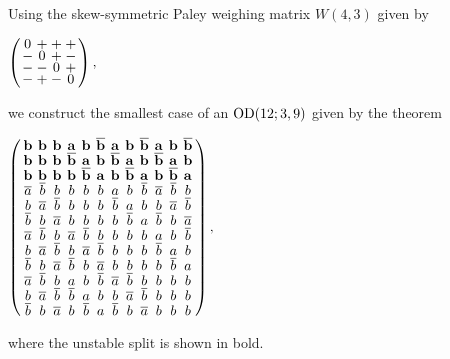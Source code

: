 \documentclass[../../../main]{subfiles}
\begin{document}
\begin{ex}
 Using the skew-symmetric Paley weighing matrix $W(4,3)$
 given by 
 \begin{defenum}
  \item $
  \arraycolsep=1.25pt\def\arraystretch{0.625}
  \left(\begin{array}{cccc}
  0&+&+&+\\
  -&0&+&-\\
  -&-&0&+\\
  -&+&-&0
  \end{array}\right),
  $
 \end{defenum}
 we construct the smallest case of an $\text{OD}(12; 3, 9)$ given by the theorem
 \begin{defenum}[resume]
  \item $
  \arraycolsep=2.0pt\def\arraystretch{0.5}
  \left(
    \begin{array}{cccccccccccc}
      \mathbf{b}&\mathbf{b}&\mathbf{b}&\mathbf{a}&\mathbf{b}&\mathbf{\bar b}&\mathbf{a}&\mathbf{b}&\mathbf{\bar b}&\mathbf{a}&\mathbf{b}&\mathbf{\bar b}\\
      \mathbf{b}&\mathbf{b}&\mathbf{b}&\mathbf{\bar b}&\mathbf{a}&\mathbf{b}&\mathbf{\bar b}&\mathbf{a}&\mathbf{b}&\mathbf{\bar b}&\mathbf{a}&\mathbf{b}\\
      \mathbf{b}&\mathbf{b}&\mathbf{b}&\mathbf{b}&\mathbf{\bar b}&\mathbf{a}&\mathbf{b}&\mathbf{\bar b}&\mathbf{a}&\mathbf{b}&\mathbf{\bar b}&\mathbf{a}\\
      \bar a&\bar b&b&b&b&b&a&b&\bar b&\bar a&\bar b&b\\
      b&\bar a&\bar b&b&b&b&\bar b&a&b&b&\bar a&\bar b\\
      \bar b&b&\bar a&b&b&b&b&\bar b&a&\bar b&b&\bar a\\
      \bar a&\bar b&b&\bar a&\bar b&b&b&b&b&a&b&\bar b\\
      b&\bar a&\bar b&b&\bar a&\bar b&b&b&b&\bar b&a&b\\
      \bar b&b&\bar a&\bar b&b&\bar a&b&b&b&b&\bar b&a\\
      \bar a&\bar b&b&a&b&\bar b&\bar a&\bar b&b&b&b&b\\
      b&\bar a&\bar b&\bar b&a&b&b&\bar a&\bar b&b&b&b\\
      \bar b&b&\bar a&b&\bar b&a&\bar b&b&\bar a&b&b&b\\
    \end{array}
  \right),
  $
 \end{defenum}
 where the unstable split is shown in bold.
\end{ex}
\end{document}
